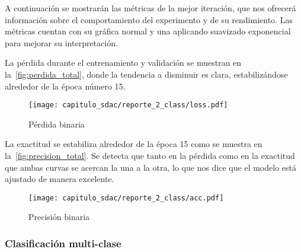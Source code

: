 \begin{table}[H]
    \centering
    \caption{Estadísticos del experimento binario}
    \label{tabla:estadisticos}
    \end{table}

A continuación se mostrarán las métricas de la mejor iteración, que nos ofrecerá
información sobre el comportamiento del experimento y de su rendimiento. Las
métricas cuentan con su gráfica normal y una aplicando suavizado exponencial
para mejorar su interpretación.

La pérdida durante el entrenamiento y validación se muestran en
la~\autoref{fig:perdida_total}, donde la tendencia a disminuir es clara,
estabilizándose alrededor de la época número 15.

\begin{figure}[H]
    \centering
    \texttt{[image: capitulo\_sdac/reporte\_2\_class/loss.pdf]}
    \caption{Pérdida binaria}\label{fig:perdida_total}
\end{figure}

La exactitud se estabiliza alrededor de la época 15 como se muestra en
la~\autoref{fig:precision_total}. Se detecta que tanto en la pérdida como en la
exactitud que ambas curvas se acercan la una a la otra, lo que nos dice que el
modelo está ajustado de manera excelente.

\begin{figure}[H]
    \centering
    \texttt{[image: capitulo\_sdac/reporte\_2\_class/acc.pdf]}
    \caption{Precisión binaria}\label{fig:precision_total}
\end{figure}
    
\subsubsection{Clasificación multi-clase}


